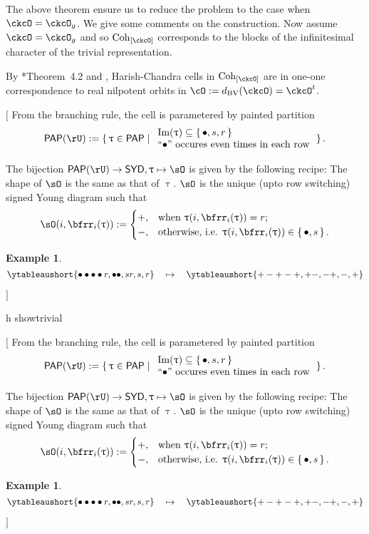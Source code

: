\documentclass[12pt,a4paper]{amsart}
\let\ytb=\ytableaushort
\newcommand{\trivial}[2][]{\if\relax\detokenize{#1}\relax
  {%
      \color{orange} \vspace{0em} $[$  #2 $]$
      \color{black}
  }
  \else
\ifx#1h
\ifcsname showtrivial\endcsname
{%
    \color{orange} \vspace{0em}  $[$ #2 $]$
    \color{black}
}
\fi
\else {\red Wrong argument!} \fi
\fi
}
\def\Im{\operatorname{Im}}
\numberwithin{equation}{section}
\newtheorem{eg}[thm]{Example}
\theoremstyle{remark}
\def\Unip{\mathrm{Unip}}
\def\dBV{d_{\mathrm{BV}}}
\def\SYD{\mathsf{SYD}}
\def\Cint#1{\Coh_{[#1]}}
\def\PP{\mathsf{PAP}}
\def\Im{\mathrm{Im}}
\def\Coh{\mathrm{Coh}}
\begin{document}

The above theorem ensure us to reduce the problem to the case when $\ckcO = \ckcO_g$.
We give some comments on the construction.
Now assume $\ckcO = \ckcO_g$ and so $\Cint{\ckcO}$ corresponds to the blocks of
the infinitesimal character of the trivial representation.

By \cite{BV.W}*{Theorem~4.2} and \cite{Bo},  Harish-Chandra cells in $\Cint{\ckcO}$ are in one-one
correspondence to real nilpotent orbits in $\cO:=\dBV(\ckcO)=\ckcO^t$.

\trivial{
From the branching rule, the cell is parametered by painted partition
\[
\PP{}(\rU):=\set{\uptau\in \PP{}| \begin{array}{l}\Im (\uptau) \subseteq  \set{\bullet, s,r}\\
  \text{``$\bullet$'' occures even times in each row}
\end{array}
  }.
\]

The bijection $\PP{}(\rU)\rightarrow \SYD, \uptau\mapsto \sO$ is given by the following recipe:
The shape of $\sO$ is the same as that of $\uptau$.
$\sO$ is the unique (upto row switching) signed Young diagram such that
\[
  \sO(i,\bfrr_i(\uptau)) := \begin{cases}
    +,  & \text{when }\uptau(i,\bfrr_i(\uptau))=r;\\
    -,  & \text{otherwise, i.e. }\uptau(i,\bfrr_i(\uptau))\in \set{\bullet,s}.
  \end{cases}
\]

\begin{eg}
  \[
 \ytb{\bullet\bullet\bullet\bullet r,\bullet\bullet , sr,s,r}
 \quad
 \mapsto\quad
 \ytb{+-+-+,+-, -+,-,+}
  \]
\end{eg}
}
\end{document}

